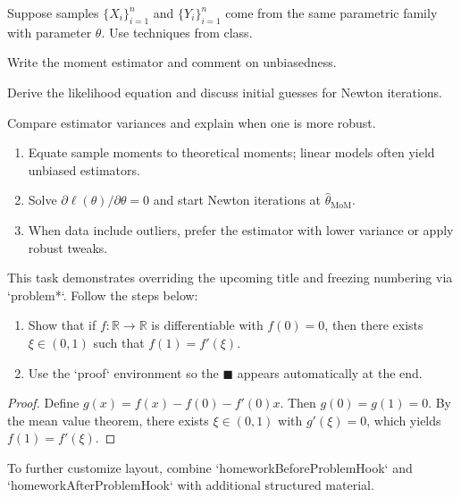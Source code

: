\documentclass[problemstyle=boxed,theme=color,captionstyle=compact,subnumbering,tightlists,mathdelims,statmacros,localizedate]{homework}
\begin{document}
\pagebreak

\begin{problem}
    Suppose samples $\{X_i\}_{i=1}^n$ and $\{Y_i\}_{i=1}^n$ come from the same parametric family with parameter $\theta$. Use techniques from class.

    \begin{subproblem}
        Write the moment estimator and comment on unbiasedness.
    \end{subproblem}
    \begin{subproblem}
        Derive the likelihood equation and discuss initial guesses for Newton iterations.
    \end{subproblem}
    \begin{subproblem*}[Discussion]
        Compare estimator variances and explain when one is more robust.
    \end{subproblem*}

    \solution

    \begin{enumerate}
        \item Equate sample moments to theoretical moments; linear models often yield unbiased estimators.
        \item Solve $\partial\ell(\theta)/\partial\theta=0$ and start Newton iterations at $\hat\theta_{\mathrm{MoM}}$.
        \item When data include outliers, prefer the estimator with lower variance or apply robust tweaks.
    \end{enumerate}
\end{problem}

\pagebreak

\begin{problem*}
    This task demonstrates overriding the upcoming title and freezing numbering via `problem*`.
    Follow the steps below:
    \begin{enumerate}
        \item Show that if $f\colon \mathbb{R}\to\mathbb{R}$ is differentiable with $f(0)=0$, then there exists $\xi\in(0,1)$ such that $f(1)=f'(\xi)$.
        \item Use the `proof` environment so the $\blacksquare$ appears automatically at the end.
    \end{enumerate}

    \solution

    \begin{proof}
        Define $g(x)=f(x)-f(0)-f'(0)x$. Then $g(0)=g(1)=0$. By the mean value theorem, there exists $\xi\in(0,1)$ with $g'(\xi)=0$, which yields $f(1)=f'(\xi)$.
    \end{proof}

    \begin{note}
        To further customize layout, combine `homeworkBeforeProblemHook` and `homeworkAfterProblemHook` with additional structured material.
    \end{note}
\end{problem*}
\end{document}
